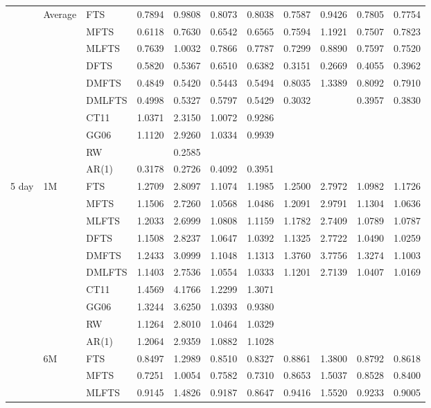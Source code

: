 \documentclass[12pt,a4paper]{article}
\def\textBF#1{\sbox\CBox{#1}\resizebox{\wd\CBox}{\ht\CBox}{\textbf{#1}}}
\begin{document}
\begin{center}
\begin{small}
\begin{longtable}{@{}lllcccccccc@{}}
  \cmidrule{2-11}
  & Average & FTS & 0.7894 & 0.9808 & 0.8073 & 0.8038 & 0.7587 & 0.9426 & 0.7805 & 0.7754 \\
  & & MFTS & 0.6118 & 0.7630 & 0.6542 & 0.6565 & 0.7594 & 1.1921 & 0.7507 & 0.7823 \\
  & & MLFTS & 0.7639 & 1.0032 & 0.7866 & 0.7787 & 0.7299 & 0.8890 & 0.7597 & 0.7520 \\
  & & DFTS &  0.5820 & 0.5367 & 0.6510 & 0.6382 & 0.3151 & 0.2669 & 0.4055 & 0.3962 \\
  & & DMFTS & 0.4849 & 0.5420 & 0.5443 & 0.5494 & 0.8035 & 1.3389 & 0.8092 & 0.7910 \\
  & & DMLFTS & 0.4998 & 0.5327 & 0.5797 & 0.5429 & 0.3032 & \textBF{0.2565} & 0.3957 & 0.3830 \\
  & & CT11 & 1.0371 & 2.3150 & 1.0072 & 0.9286 \\
  & & GG06 & 1.1120 & 2.9260 & 1.0334 & 0.9939 \\ 
  & & RW & \textBF{0.3024} & 0.2585 & \textBF{0.3955} & \textBF{0.3825} \\
  & & AR(1) & 0.3178 & 0.2726 & 0.4092 & 0.3951 \\
\midrule
  5 day & 1M & FTS & 1.2709 & 2.8097 & 1.1074 & 1.1985 & 1.2500 & 2.7972 & 1.0982 & 1.1726 \\
& & MFTS & 1.1506 & 2.7260 & 1.0568 & 1.0486 & 1.2091 & 2.9791 & 1.1304 & 1.0636 \\
& & MLFTS & 1.2033 & 2.6999 & 1.0808 & 1.1159 & 1.1782 & 2.7409 & 1.0789 & 1.0787 \\
& & DFTS & 1.1508 & 2.8237 & 1.0647 & 1.0392 & 1.1325 & 2.7722 & 1.0490 & 1.0259 \\ 
& & DMFTS & 1.2433 & 3.0999 & 1.1048 & 1.1313 & 1.3760 & 3.7756 & 1.3274 & 1.1003  \\
& & DMLFTS & 1.1403 & 2.7536 & 1.0554 & 1.0333 & 1.1201 & 2.7139 & 1.0407 & 1.0169 \\
& & CT11 & 1.4569 & 4.1766 & 1.2299 & 1.3071\\
& & GG06 & 1.3244 & 3.6250 & 1.0393 & 0.9380 \\
& & RW & 1.1264 & 2.8010 & 1.0464 & 1.0329  \\
& & AR(1) & 1.2064 & 2.9359 & 1.0882 & 1.1028 \\
  \cmidrule{2-11}
  & 6M & FTS & 0.8497 & 1.2989 & 0.8510 & 0.8327 & 0.8861 & 1.3800 & 0.8792 & 0.8618 \\
& & MFTS & 0.7251 & 1.0054 & 0.7582 & 0.7310 & 0.8653 & 1.5037 & 0.8528 & 0.8400 \\
& & MLFTS & 0.9145 & 1.4826 & 0.9187 & 0.8647 & 0.9416 & 1.5520 & 0.9233 & 0.9005 \\

\end{longtable}
\end{small}
\end{center}
\end{document}
